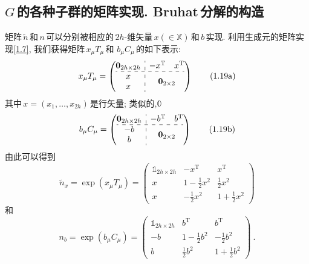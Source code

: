 \subsection{$G\,$的各种子群的矩阵实现. Bruhat\,分解的构造}

矩阵$\,\tilde{n}\,$和$\,n\,$可以分别被相应的\,$2h$-维矢量$\,x(\in \mathbb{X})\,$和$\,b\,$实现. 
利用生成元的矩阵实现\eqref{1.7}, 我们获得矩阵$\,x_{\mu}T_{\mu}\,$和 $b_{\mu}C_{\mu}\,$的如下表示:
\begin{equation}
    x_{\mu}T_{\mu}= \left(
        \begin{array}{@{}c:c@{}}
            \mathbf{0}_{2h\times 2h} & \begin{matrix}
                -x^{\mathrm{T}} & x^{\mathrm{T}} 
            \end{matrix} \\ \hdashline[4pt/4pt]
            \begin{matrix}
                x \\ x
            \end{matrix} &
            \mathbf{0}_{2\times 2}
        \end{array}
    \right) \tag{1.19a} \label{1.19a}
\end{equation}
其中$\,x=(x_{1},\ldots,x_{2h})\,$是行矢量; 类似的,$\mathds{0}$
\begin{equation}
    b_{\mu}C_{\mu}= \left(
        \begin{array}{@{}c:c@{}}
            \mathbf{0}_{2h\times 2h} & \begin{matrix}
                -b^{\mathrm{T}} & b^{\mathrm{T}} 
            \end{matrix} \\ \hdashline[4pt/4pt]
            \begin{matrix}
                -b \\ b
            \end{matrix} &
            \mathbf{0}_{2\times 2} 
        \end{array}
    \right) \tag{1.19b} \label{1.19b}
\end{equation}
由此可以得到
\begin{equation}
    \tilde{n}_{x}=\exp(x_{\mu}T_{\mu}) =
    \begin{pmatrix}
        \mathds{1}_{2h\times 2h} & -x^{\mathrm{T}} &  x^{\mathrm{T}} \\
        x  & 1-\tfrac{1}{2}x^{2} & \tfrac{1}{2}x^{2} \\
        x & -\tfrac{1}{2}x^{2} & 1+\tfrac{1}{2}x^{2}
    \end{pmatrix}  \tag{1.20a} \label{1.20a}
\end{equation}
和
\begin{equation}
    n_{b}=\exp(b_{\mu}C_{\mu}) =
    \begin{pmatrix}
        \mathds{1}_{2h\times 2h} & b^{\mathrm{T}} &  b^{\mathrm{T}} \\
        -b  & 1-\tfrac{1}{2}b^{2} & -\tfrac{1}{2}b^{2} \\
        b & \tfrac{1}{2}b^{2} & 1+\tfrac{1}{2}b^{2}
    \end{pmatrix}  \tag{1.20b} \label{1.20b} \:.
\end{equation}
\setcounter{equation}{20}

